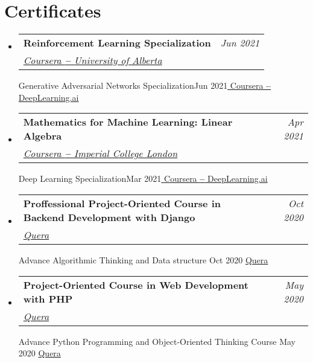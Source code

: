 \documentclass[letterpaper,11pt]{article}
\makeatletter
\newcommand{\resumeOrganizationHeading}[4]{
  \vspace{-2pt}\item
    \begin{tabular*}{0.97\textwidth}[t]{l@{\extracolsep{\fill}}r}
      \textbf{#1} & \textit{\small #2} \\
      \textit{\small#3}
    \end{tabular*}\vspace{-7pt}
}
\newcommand{\resumeSubHeadingListStart}{\begin{itemize}[leftmargin=0.15in, label={}]}
\newcommand{\resumeSubHeadingListEnd}{\end{itemize}}
\makeatother
\begin{document}

\section{Certificates}
\resumeSubHeadingListStart

\resumeOrganizationHeading
{Reinforcement Learning Specialization}{Jun 2021}{\href{https://coursera.org/share/38a7e63a9ebdbc73df6e85bcc6e10280}{\color{blue} Coursera \textbf{--} University of Alberta}}

\resumeOrganizationHeading
{Generative Adversarial Networks Specialization}{Jun 2021}{\href{https://coursera.org/share/f9336c54f7b154755888c616512824b8}{\color{blue} Coursera \textbf{--} DeepLearning.ai}}

\resumeOrganizationHeading
{Mathematics for Machine Learning: Linear Algebra}{Apr 2021}{\href{https://www.coursera.org/account/accomplishments/certificate/4Q3SNCJBQQ2D}{\color{blue}Coursera \textbf{--} Imperial College London}}

\resumeOrganizationHeading
{Deep Learning Specialization}{Mar 2021}{\href{https://www.coursera.org/account/accomplishments/specialization/certificate/ZVSQTA78X4DK}{\color{blue} Coursera \textbf{--} DeepLearning.ai}}

\resumeOrganizationHeading
{Proffessional Project-Oriented Course in Backend Development with Django} {Oct 2020}
{\href{https://quera.org/certificate/LcnssaOX/}{\color{blue}Quera}}

\resumeOrganizationHeading
{Advance Algorithmic Thinking and Data structure} {Oct 2020}
{\href{https://quera.org/certificate/TutKPvCg/}{\color{blue}Quera}}

\resumeOrganizationHeading
{Project-Oriented Course in Web Development with PHP} {May 2020}
{\href{https://quera.org/certificate/Au1OnMWM/}{\color{blue}Quera}}

\resumeOrganizationHeading
{Advance Python Programming and Object-Oriented Thinking Course} {May 2020}
{\href{https://quera.org/certificate/Au1OnMWM/}{\color{blue}Quera}}

\resumeSubHeadingListEnd



\end{document}
